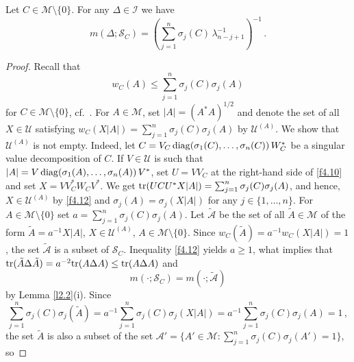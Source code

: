 \documentclass{amsart}
\begin{document}
\begin{pro} \label{p4.6}
     Let $C \in {\mathcal M} \setminus \{ 0 \}$. For any $\Delta \in {\mathcal I}$ we have
     \begin{equation} \label{f4.11}
           m(\Delta ; {\mathcal S}_C) = \left( \sum_{j=1}^n \sigma_j(C) \, \lambda_{n-j+1}^{-1} \right)^{-1} \, .
     \end{equation}
\end{pro}

\begin{proof}
Recall that
\begin{equation} \label{f4.12}
        w_C(A) \leq \sum_{j=1}^n \sigma_j(C) \sigma_j(A) 
\end{equation}
for $C \in {\mathcal M} \setminus \{ 0 \}$, cf.~\cite[20.B.1]{MOA}. For $A \in \mathcal M$, set $|A|=(A^*A)^{1/2}$ and denote the set of all $X \in \mathcal U$ satisfying $w_C(X|A|) = \sum_{j=1}^n \sigma_j(C) \sigma_j(A)$ by ${\mathcal U}^{(A)}$. We show that ${\mathcal U}^{(A)}$ is not empty. Indeed, let $C= V_C \, {\rm diag}(\sigma_1(C), \ldots , \sigma_n(C) ) \, W_C^*$ be a singular value decomposition of $C$. If $V \in \mathcal U$ is such that $|A| = V \, {\rm diag}(\sigma_1(A), \ldots , \sigma_n(A)) \, V^*$, set $U=VV_C$ at the right-hand side of \eqref{f4.10} and set $X=VV_C^*W_CV^*$. We get ${\rm tr}(UCU^*X|A|) = \sum_{j=1}^n \sigma_j(C) \sigma_j(A)$, and hence, $X \in {\mathcal U}^{(A)}$ by \eqref{f4.12} and $\sigma_j(A) = \sigma_j(X|A|)$ for any $j \in \{ 1,\ldots,n\}$. For $A \in {\mathcal M} \setminus \{0\}$ set $a=\sum_{j=1}^n \sigma_j(C) \sigma_j(A)$. Let $\tilde{{\mathcal A}}$ be the set of all $\tilde{A} \in \mathcal M$ of the form $\tilde{A} = a^{-1}X|A|$, $X \in {\mathcal U}^{(A)}$, $A \in {\mathcal M} \setminus \{0\}$. Since $w_C(\tilde{A})=a^{-1} w_C(X|A|) = 1$, the set $\tilde{\mathcal A}$ is a subset of ${\mathcal S}_C$. Inequality \eqref{f4.12} yields $a \geq 1$, what implies that ${\rm tr}(\tilde{A}\Delta \tilde{A}) = a^{-2} {\rm tr}(A\Delta A) \leq {\rm tr}(A \Delta A)$ and
        \begin{equation} \label{f4.13}
              m( \cdot ; {\mathcal S}_C) = m( \cdot ; \tilde{\mathcal A})
        \end{equation}
by Lemma \ref{l2.2}(i). Since 
\[ 
\sum_{j=1}^n \sigma_j(C) \sigma_j(\tilde{A}) = a^{-1} \sum_{j=1}^n \sigma_j(C) \sigma_j(X|A|) =a^{-1} \sum_{j=1}^n \sigma_j(C) \sigma_j(A) = 1 \, , 
\]
the set $\tilde{A}$ is also a subset of the set ${\mathcal A}' = \{ A' \in {\mathcal M} : \sum_{j=1}^n \sigma_j(C) \sigma_j(A')=1 \}$, so

\end{proof}
\end{document}
